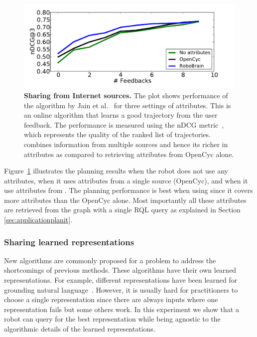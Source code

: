 \begin{figure}
\centering
\includegraphics[width=\linewidth]{Image/internet_attributes}
\caption{\textbf{Sharing from Internet sources.} The plot shows performance of  the algorithm by Jain et al.~\citep{jainsaxena2013_trajectorypreferences} for three settings of attributes. This is an online algorithm that learns a good trajectory from the user feedback. The performance is measured using the nDCG metric~\cite{manning2008introduction}, which represents the quality of the ranked list of trajectories. \robobrain{} combines information from multiple sources and hence its richer in attributes as compared to retrieving attributes from OpenCyc alone.}
\label{fig:ndcg}
\end{figure}

Figure~\ref{fig:ndcg} illustrates the planning results when the robot does not use any attributes, when it uses attributes from a single source (OpenCyc), and when it use attributes from \robobrain{}. The planning performance is best when using \robobrain{} since it covers more attributes than the OpenCyc alone. Most importantly all these attributes are retrieved from the \robobrain{} graph with a single RQL query as explained in Section \ref{sec:applicationplanit}.


\subsubsection{Sharing learned representations}

New algorithms are commonly proposed for a problem to address the shortcomings of previous methods. These algorithms have their own learned representations. For example,  different representations  have been learned for grounding natural language~\citep{tellex2011understanding,misra2014tell,guadarrama2013grounding, MatuszekISER2012}. However, it is usually hard for practitioners to choose a single representation since there are always inputs where one representation fails but some others work. In this experiment we show that a robot can query \robobrain{} for the best representation while being agnostic to the algorithmic details of the learned representations.


